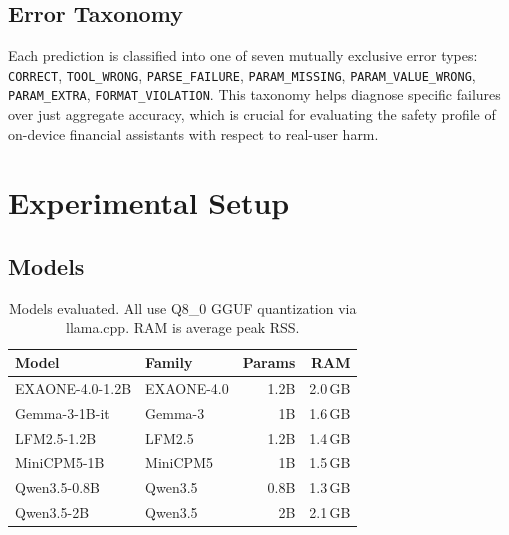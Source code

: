 \documentclass[11pt,twocolumn]{article}
\begin{document}
\subsection{Error Taxonomy}

Each prediction is classified into one of seven mutually exclusive
error types: \texttt{CORRECT}, \texttt{TOOL\_WRONG},
\texttt{PARSE\_FAILURE}, \texttt{PARAM\_MISSING},
\texttt{PARAM\_VALUE\_WRONG}, \texttt{PARAM\_EXTRA},
\texttt{FORMAT\_VIOLATION}.
This taxonomy helps diagnose specific failures over just aggregate
accuracy, which is crucial for evaluating the safety profile
of on-device financial assistants with respect to real-user harm.

\section{Experimental Setup}

\subsection{Models}

\begin{table}[t]
\centering
\footnotesize
\setlength{\tabcolsep}{4pt}
\begin{tabular}{@{}p{2.8cm}p{2.0cm}rr@{}}
\toprule
\textbf{Model} & \textbf{Family} & \textbf{Params} & \textbf{RAM} \\
\midrule
EXAONE-4.0-1.2B & EXAONE-4.0 \citeyearpar{lgai2025exaone} & 1.2B & 2.0\,GB \\
Gemma-3-1B-it   & Gemma-3 \citeyearpar{team2025gemma}     & 1B   & 1.6\,GB \\
LFM2.5-1.2B     & LFM2.5 \citeyearpar{liquidai2026lfm25}  & 1.2B & 1.4\,GB \\
MiniCPM5-1B     & MiniCPM5 \citeyearpar{openbmb2026minicpm5}       & 1B   & 1.5\,GB \\
Qwen3.5-0.8B    & Qwen3.5 \citeyearpar{qwen2026qwen35}    & 0.8B & 1.3\,GB \\
Qwen3.5-2B      & Qwen3.5 \citeyearpar{qwen2026qwen35}    & 2B   & 2.1\,GB \\
\bottomrule
\end{tabular}
\caption{Models evaluated. All use Q8\_0 GGUF quantization via
llama.cpp. RAM is average peak RSS.}
\label{tab:models}
\end{table}
\end{document}
